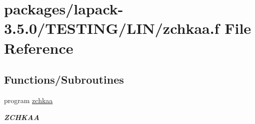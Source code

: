 \hypertarget{zchkaa_8f}{}\section{packages/lapack-\/3.5.0/\+T\+E\+S\+T\+I\+N\+G/\+L\+I\+N/zchkaa.f File Reference}
\label{zchkaa_8f}
\subsection*{Functions/\+Subroutines}
\begin{DoxyCompactItemize}
\item 
program \hyperlink{group__complex16__lin_ga25109e0598738760709f81202f3fd7ce}{zchkaa}
\begin{DoxyCompactList}\small\item\em {\bfseries Z\+C\+H\+K\+A\+A} \end{DoxyCompactList}\end{DoxyCompactItemize}
